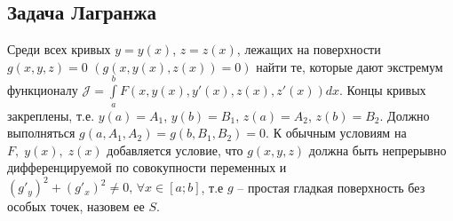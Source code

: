 \subsection{Задача Лагранжа}\par

Среди всех кривых $y=y(x)$, $z=z(x)$, лежащих на поверхности $g(x,y,z)=0$ $(g(x,y(x),z(x))=0)$ найти те, которые дают экстремум функционалу $\mathcal{J}=\int\limits_a^b F(x,y(x),y'(x),z(x),z'(x))d x$. Концы кривых закреплены, т.е. $y(a)=A_1$, $y(b)=B_1$, $z(a)=A_2$, $z(b)=B_2$.
Должно выполняться $g(a,A_1,A_2)= g(b,B_1,B_2)=0$. К обычным условиям на $F,\;y(x),\;z(x)$ добавляется условие, что $g(x,y,z)$ должна быть непрерывно дифференцируемой по совокупности переменных и $(g'_y)^2+(g'_x)^2\neq 0, \,\forall x \in [a;b]$, т.е $g$ -- простая гладкая поверхность без особых точек, назовем ее $S$.

